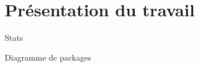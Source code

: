 \section{Présentation du travail}%

\begin{frame}{Stats}
\end{frame}
\begin{frame}{Diagramme de packages}

\end{frame}

\begin{frame}{}

\end{frame}